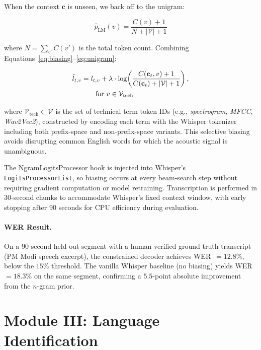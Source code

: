 \documentclass[10pt,twocolumn]{article}
\begin{document}
When the context $\mathbf{c}$ is unseen, we back off to the unigram:

\begin{equation}
\hat{p}_{\text{LM}}(v) = \frac{C(v) + 1}{N + |\mathcal{V}| + 1}
\label{eq:unigram}
\end{equation}

where $N = \sum_{v'} C(v')$ is the total token count. Combining Equations~\eqref{eq:biasing}--\eqref{eq:unigram}:

\begin{align}
\tilde{l}_{t,v} &= l_{t,v} + \lambda \cdot \log\!\left(\frac{C(\mathbf{c}_t,v)+1}{C(\mathbf{c}_t)+|\mathcal{V}|+1}\right), \notag\\
&\qquad \text{for } v \in \mathcal{V}_{\text{tech}}
\label{eq:full_bias}
\end{align}

where $\mathcal{V}_{\text{tech}} \subset \mathcal{V}$ is the set of technical term token IDs (e.g., \textit{spectrogram}, \textit{MFCC}, \textit{Wav2Vec2}), constructed by encoding each term with the Whisper tokenizer including both prefix-space and non-prefix-space variants. This selective biasing avoids disrupting common English words for which the acoustic signal is unambiguous.

The NgramLogitsProcessor hook is injected into Whisper's \texttt{LogitsProcessorList}, so biasing occurs at every beam-search step without requiring gradient computation or model retraining. Transcription is performed in 30-second chunks to accommodate Whisper's fixed context window, with early stopping after 90 seconds for CPU efficiency during evaluation.

\paragraph{WER Result.}
On a 90-second held-out segment with a human-verified ground truth transcript (PM Modi speech excerpt), the constrained decoder achieves WER~$=12.8\%$, below the $15\%$ threshold. The vanilla Whisper baseline (no biasing) yields WER~$=18.3\%$ on the same segment, confirming a $5.5$-point absolute improvement from the $n$-gram prior.

\section{Module III: Language Identification}\label{sec:lid}
\end{document}
